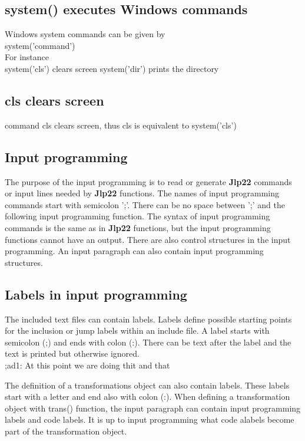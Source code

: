 \subsection{system() executes Windows commands} 
\label{systemcom} 
Windows system commands can be given by\\ 
system('command')\\ 
For instance \\ 
system('cls') clears screen 
system('dir') prints the directory 
\subsection{cls clears screen} 
\label{cls} 
command cls clears screen, thus cls is equivalent to system('cls') 
\subsection{Input programming} 
\label{inpuprog} 
The purpose of the input programming is to read or generate \textbf{Jlp22} commands or input lines 
needed by \textbf{Jlp22} functions. The names of input programming commands start with semicolon ';'. 
There can be no space between ';' and the following input programming function. The syntax 
of input programming commands is the same as in \textbf{Jlp22} functions, but the input programming 
functions cannot have an output. There are also control structures in the input programming. 
An input paragraph can also contain input programming structures. 
\subsection{ Labels in input programming} 
\label{inpuad} 
 
The included text files can contain labels. Labels define possible starting points for the 
inclusion or jump labels within an include file. A label starts with semicolon (;) and 
ends with colon (:). There can be text after the label and the text is printed but 
otherwise ignored.\\ 
 
 
;ad1:  At this point we are doing thit and that 
 
 
\begin{note} 
The definition of a transformations object can also contain labels. These labels start 
with a letter and end also with colon (:). When defining a transformation object with \textcolor{VioletRed}{trans}() function, 
the input paragraph can contain input programming labels and code labels. It is up to 
input programming what code alabels become part of the transformation object. 
\end{note} 
 
